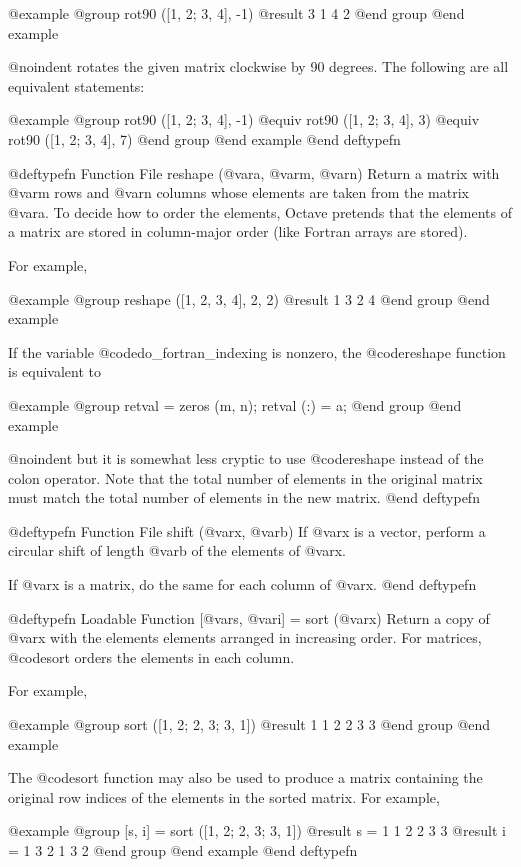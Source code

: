 @example
@group
rot90 ([1, 2; 3, 4], -1)
     @result{}  3  1
         4  2
@end group
@end example

@noindent
rotates the given matrix clockwise by 90 degrees.  The following are all
equivalent statements:

@example
@group
rot90 ([1, 2; 3, 4], -1)
@equiv{}
rot90 ([1, 2; 3, 4], 3)
@equiv{}
rot90 ([1, 2; 3, 4], 7)
@end group
@end example
@end deftypefn

@deftypefn {Function File} {} reshape (@var{a}, @var{m}, @var{n})
Return a matrix with @var{m} rows and @var{n} columns whose elements are
taken from the matrix @var{a}.  To decide how to order the elements,
Octave pretends that the elements of a matrix are stored in column-major
order (like Fortran arrays are stored).

For example,

@example
@group
reshape ([1, 2, 3, 4], 2, 2)
     @result{}  1  3
         2  4
@end group
@end example

If the variable @code{do_fortran_indexing} is nonzero, the
@code{reshape} function is equivalent to

@example
@group
retval = zeros (m, n);
retval (:) = a;
@end group
@end example

@noindent
but it is somewhat less cryptic to use @code{reshape} instead of the
colon operator.  Note that the total number of elements in the original
matrix must match the total number of elements in the new matrix.
@end deftypefn

@deftypefn {Function File} {} shift (@var{x}, @var{b})
If @var{x} is a vector, perform a circular shift of length @var{b} of
the elements of @var{x}.

If @var{x} is a matrix, do the same for each column of @var{x}.
@end deftypefn

@deftypefn {Loadable Function} {[@var{s}, @var{i}] =} sort (@var{x})
Return a copy of @var{x} with the elements elements arranged in
increasing order.  For matrices, @code{sort} orders the elements in each
column.

For example,

@example
@group
sort ([1, 2; 2, 3; 3, 1])
     @result{}  1  1
         2  2
         3  3
@end group
@end example

The @code{sort} function may also be used to produce a matrix
containing the original row indices of the elements in the sorted
matrix.  For example,

@example
@group
[s, i] = sort ([1, 2; 2, 3; 3, 1])
     @result{} s = 1  1
            2  2
            3  3
     @result{} i = 1  3
            2  1
            3  2
@end group
@end example
@end deftypefn

